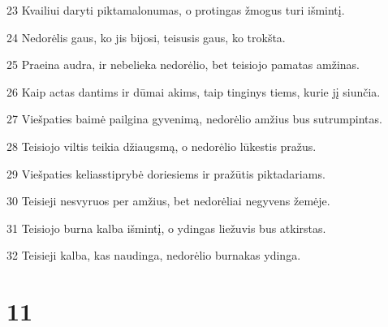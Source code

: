 \par 23 Kvailiui daryti pikta­malonumas, o protingas žmogus turi išmintį. 
\par 24 Nedorėlis gaus, ko jis bijosi, teisusis gaus, ko trokšta. 
\par 25 Praeina audra, ir nebelieka nedorėlio, bet teisiojo pamatas amžinas. 
\par 26 Kaip actas dantims ir dūmai akims, taip tinginys tiems, kurie jį siunčia. 
\par 27 Viešpaties baimė pailgina gyvenimą, nedorėlio amžius bus sutrumpintas. 
\par 28 Teisiojo viltis teikia džiaugsmą, o nedorėlio lūkestis pražus. 
\par 29 Viešpaties kelias­stiprybė doriesiems ir pražūtis piktadariams. 
\par 30 Teisieji nesvyruos per amžius, bet nedorėliai negyvens žemėje. 
\par 31 Teisiojo burna kalba išmintį, o ydingas liežuvis bus atkirstas. 
\par 32 Teisieji kalba, kas naudinga, nedorėlio burna­kas ydinga.



\chapter{11}


